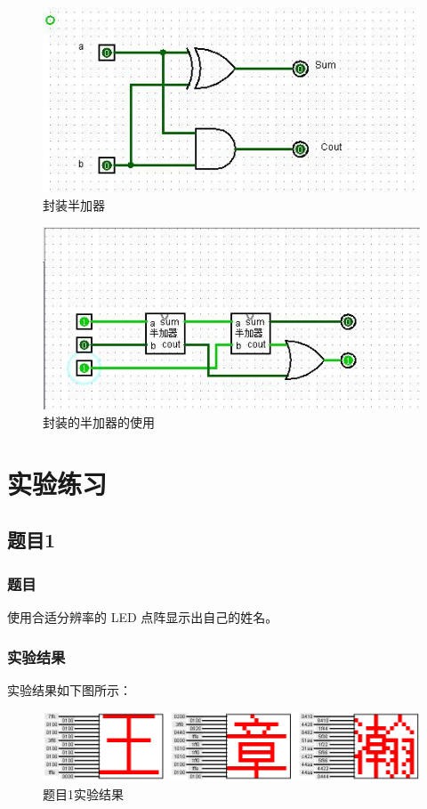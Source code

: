 \documentclass[UTF8]{article}
\begin{document}
	\begin{figure}[H]
		\centering
		\includegraphics[scale=0.4]{detail_of_half-adder.jpg}
		\caption{封装半加器}
		\label{detailofhalfadder}
	\end{figure}
	
	\begin{figure}[H]
		\centering
		\includegraphics[scale=0.4]{use_of_half-adder.jpg}
		\caption{封装的半加器的使用}
		\label{useofhalfadder}
	\end{figure}
	
	\section{实验练习}
	
	\subsection{题目1}
	\subsubsection{题目}
	使用合适分辨率的 LED 点阵显示出自己的姓名。\par
	\subsubsection{实验结果}
	实验结果如下图所示：
	\begin{figure}[h]
		\centering
		\includegraphics[scale=0.4]{1.png}
		\caption{题目1实验结果}
		\label{1}
	\end{figure}
\end{document}
